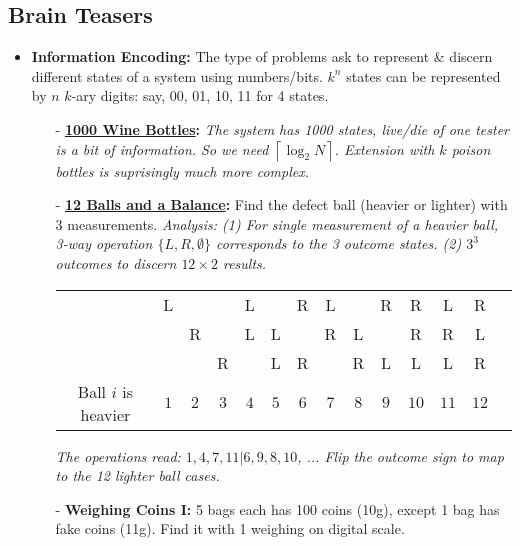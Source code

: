 \documentclass[9pt, landscape]{article}
\begin{document}
    
\footnotesize


\begin{multicols*}{3}
\section{Brain Teasers}
\begin{itemize}
	\item \textbf{Information Encoding:} The type of problems ask to represent \& discern different states of a system using numbers/bits. $k^{n}$ states can be represented by $n$ $k$-ary digits: say, 00, 01, 10, 11 for 4 states.
	\begin{itemize}[leftmargin=10pt,noitemsep,topsep=0pt,partopsep=0pt]
		\item[-] \textbf{\href{https://math.stackexchange.com/questions/639/logic-problem-identifying-poisoned-wines-out-of-a-sample-minimizing-test-subje}{1000 Wine Bottles}:} \textit{The system has 1000 states, live/die of one tester is a bit of information. So we need $\left \lceil{\log_2 N}\right \rceil$. Extension with $k$ poison bottles is suprisingly much more complex.}
		\item[-] \textbf{\href{https://puzzling.stackexchange.com/questions/183/twelve-balls-and-a-scale/224\#224}{12 Balls and a Balance}:} Find the defect ball (heavier or lighter) with 3 measurements. 
		\textit{Analysis: (1) For single measurement of a heavier ball, 3-way operation $\{L, R, \emptyset\}$ corresponds to the 3 outcome states. (2) $3^3$ outcomes to discern $12\times 2$ results.} 
		\begin{center}
		\tiny
		\setlength{\tabcolsep}{3pt}
		\begin{tabular}{ |c|c|c|c|c|c|c|c|c|c|c|c|c|c| } 
		 \hline
		 & 
		  L& & &L& &R&L& &R&R&L&R \\ 
		 & &R& &L&L& &R&L& &R&R&L \\ 
		 & & &R& &L&R& &R&L&L&L&R \\ 
		 \hline
		 Ball $i$ is heavier & $1$ & $2$ & $3$ & $4$ & $5$ & $6$ & $7$ & $8$ & $9$ & $10$ & $11$ & $12$ \\
		 \hline
		\end{tabular}
		\end{center}
		\textit{The operations read: $1,4,7,11|6,9,8,10$, ... Flip the outcome sign to map to the 12 lighter ball cases.}
		\item[-] \textbf{Weighing Coins I:} 5 bags each has 100 coins  (10g), except 1 bag has fake coins (11g). Find it with 1 weighing on digital scale. \\

\end{itemize}
\end{itemize}
\end{multicols*}
\end{document}
